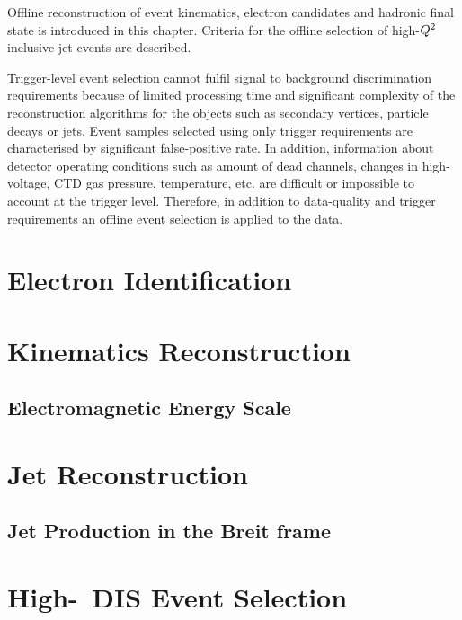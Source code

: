 Offline reconstruction of event kinematics, electron candidates and hadronic final state is introduced in this chapter. Criteria for the offline selection of high-$\mbox{${Q^2}$}$ inclusive jet events are described. 

Trigger-level event selection cannot fulfil signal to background discrimination requirements because of limited processing time and significant complexity of the reconstruction algorithms for the objects such as secondary vertices, particle decays or jets. Event samples selected using only trigger requirements are characterised by significant false-positive rate. In addition, information about detector operating conditions such as amount of dead channels, changes in high-voltage, CTD gas pressure, temperature, etc. are difficult or impossible to account at the trigger level. Therefore, in addition to data-quality and trigger requirements an offline event selection is applied to the data.

\section{Electron Identification}
\label{sec:eleid}


\section{Kinematics Reconstruction}
\label{sec:kinrec}


\subsection{Electromagnetic Energy Scale}
\label{subsec:eleenescale}


\section{Jet Reconstruction}
\label{sec:jetreco}


\subsection{Jet Production in the Breit frame}
\label{subsec:jetsinbreit}


\section{High-\qsq\, DIS Event Selection}
\label{sec:dissel}

